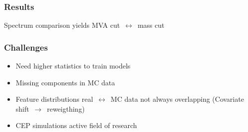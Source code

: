 \documentclass{beamer}
\begin{document}
\begin{frame}
    \frametitle{Results}
    Spectrum comparison yields MVA cut~$\leftrightarrow$~mass cut\\
    \vspace*{5mm}
    \centering{}
\end{frame}


\begin{frame}
    \frametitle{Challenges}
    \begin{itemize}
        \item Need higher statistics to train models
        \item Missing components in MC data 
        \item Feature distributions real~$\leftrightarrow$~MC data not always overlapping (Covariate shift~$\to$~reweigthing)
        \item CEP simulations active field of research
    \end{itemize}
\end{frame}
\end{document}
